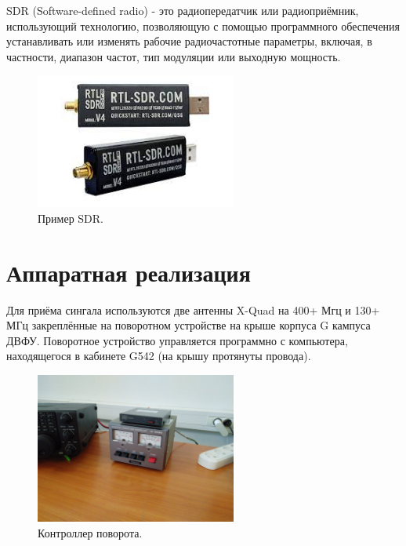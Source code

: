 \documentclass[a4paper, 14pt, titlepage, fleqn]{extarticle}
\begin{document}
	SDR (Software-defined radio) - это  радиопередатчик или радиоприёмник, использующий технологию, позволяющую с помощью программного обеспечения устанавливать или изменять рабочие радиочастотные параметры, включая, в частности, диапазон частот, тип модуляции или выходную мощность.
	
	\begin{figure}[H]
		\centering
		\includegraphics[width=250px]{sdr.jpeg}
		\caption{Пример SDR.}
	\end{figure}
	
	\pagebreak
	\section*{Аппаратная реализация}
	
	Для приёма сингала используются две антенны X-Quad на 400+ Мгц и 130+ МГц закреплённые на поворотном устройстве на крыше корпуса G кампуса ДВФУ. Поворотное устройство управляется программно с компьютера, находящегося в кабинете G542 (на крышу протянуты провода).
	
	\begin{figure}[H]
		\centering
		\includegraphics[width=250px]{control.jpg}
		\caption{Контроллер поворота.}
	\end{figure}
	
\end{document}
